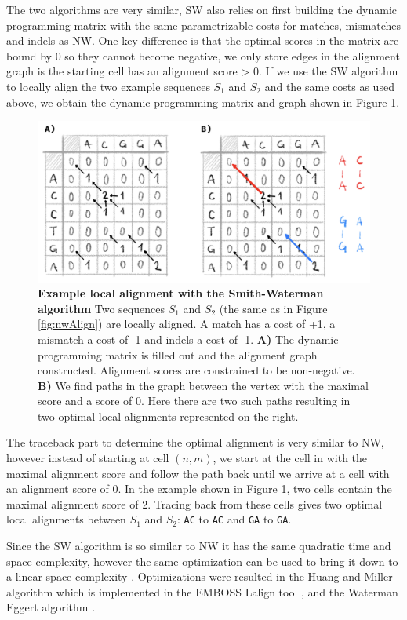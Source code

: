 \documentclass[
  11pt,
  twoside]{scrbook}
\newcommand{\extcaption}[2]{
    \caption[#1]{
        \textbf{#1}\newline
        #2
    }
}
\begin{document}
The two algorithms are very similar, SW also relies on first building the dynamic programming matrix with the same parametrizable costs for matches, mismatches and indels as NW. One key difference is that the optimal scores in the matrix are bound by 0 so they cannot become negative, we only store edges in the alignment graph is the starting cell has an alignment score \textgreater{} 0. If we use the SW algorithm to locally align the two example sequences \(S_1\) and \(S_2\) and the same costs as used above, we obtain the dynamic programming matrix and graph shown in Figure \ref{fig:swAlign}.

\begin{figure}[h]
\centering
\includegraphics[width=0.6\linewidth]{./figures/Align-Intro/SW-total.png}
\extcaption{Example local alignment with the Smith-Waterman algorithm}{Two sequences $S_1$ and $S_2$ (the same as in Figure \ref{fig:nwAlign}) are locally aligned. A match has a cost of +1, a mismatch a cost of -1 and indels a cost of -1. \textbf{A)} The dynamic programming matrix is filled out and the alignment graph constructed. Alignment scores are constrained to be non-negative. \textbf{B)} We find paths in the graph between the vertex with the maximal score and a score of 0. Here there are two such paths resulting in two optimal local alignments represented on the right. }
\label{fig:swAlign}
\end{figure}

The traceback part to determine the optimal alignment is very similar to NW, however instead of starting at cell \((n,m)\), we start at the cell in with the maximal alignment score and follow the path back until we arrive at a cell with an alignment score of 0. In the example shown in Figure \ref{fig:swAlign}, two cells contain the maximal alignment score of 2. Tracing back from these cells gives two optimal local alignments between \(S_1\) and \(S_2\): \texttt{AC} to \texttt{AC} and \texttt{GA} to \texttt{GA}.

Since the SW algorithm is so similar to NW it has the same quadratic time and space complexity, however the same optimization can be used to bring it down to a linear space complexity \autocite{sungAlgorithmsBioinformaticsPractical2011}. Optimizations were resulted in the Huang and Miller algorithm \autocite{huangTimeefficientLinearspaceLocal1991} which is implemented in the EMBOSS Lalign tool \autocite{riceEMBOSSEuropeanMolecular2000}, and the Waterman Eggert algorithm \autocite{watermanNewAlgorithmBest1987}.
\end{document}
